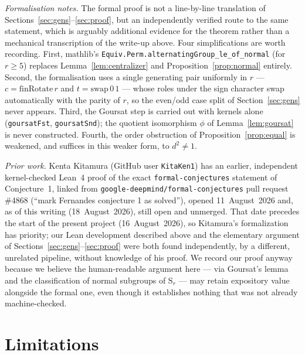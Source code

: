 \documentclass[11pt]{article}
\theoremstyle{plain}
\theoremstyle{definition}
\theoremstyle{remark}
\numberwithin{equation}{section}
\newcommand{\Sym}{\mathrm{S}}
\begin{document}
\emph{Formalisation notes.} The formal proof is not a line-by-line translation of
Sections~\ref{sec:gens}--\ref{sec:proof}, but an independently verified route to the same
statement, which is arguably additional evidence for the theorem rather than a mechanical
transcription of the write-up above. Four simplifications are worth recording. First, mathlib's
\texttt{Equiv.Perm.alternatingGroup\_le\_of\_normal} (for $r \ge 5$) replaces
Lemma~\ref{lem:centralizer} and Proposition~\ref{prop:normal} entirely. Second, the formalisation
uses a single generating pair uniformly in $r$ --- $c = \mathrm{finRotate}\,r$ and
$t = \mathrm{swap}\,0\,1$ --- whose roles under the sign character swap automatically with the
parity of $r$, so the even/odd case split of Section~\ref{sec:gens} never appears. Third, the
Goursat step is carried out with kernels alone (\texttt{goursatFst}, \texttt{goursatSnd}); the
quotient isomorphism $\phi$ of Lemma~\ref{lem:goursat} is never constructed. Fourth, the order
obstruction of Proposition~\ref{prop:equal} is weakened, and suffices in this weaker form, to
$d^2 \ne 1$.

\emph{Prior work.} Kenta Kitamura (GitHub user \texttt{KitaKen1}) has an earlier, independent
kernel-checked Lean~4 proof of the exact \texttt{formal-conjectures} statement of Conjecture~1,
linked from \texttt{google-deepmind/formal-conjectures} pull request \#4868 (``mark Fernandes
conjecture 1 as solved''), opened 11~August~2026 and, as of this writing (18~August~2026), still
open and unmerged. That date precedes the start of the present project (16~August~2026), so
Kitamura's formalization has priority; our Lean development described above and the
elementary argument of Sections~\ref{sec:gens}--\ref{sec:proof} were both found independently,
by a different, unrelated pipeline, without knowledge of his proof. We record our proof anyway
because we believe the human-readable argument here --- via Goursat's lemma and the classification
of normal subgroups of $\Sym_r$ --- may retain expository value alongside the formal one, even
though it establishes nothing that was not already machine-checked.

\section{Limitations}
\label{sec:limits}
\end{document}

